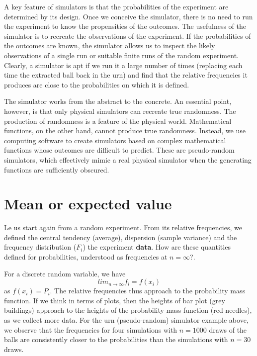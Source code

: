 \documentclass[
]{book}
\begin{document}
A key feature of simulators is that the probabilities of the experiment are determined by its design. Once we conceive the simulator, there is no need to run the experiment to know the propensities of the outcomes. The usefulness of the simulator is to recreate the observations of the experiment. If the probabilities of the outcomes are known, the simulator allows us to inspect the likely observations of a single run or suitable finite runs of the random experiment. Clearly, a simulator is apt if we run it a large number of times (replacing each time the extracted ball back in the urn) and find that the relative frequencies it produces are close to the probabilities on which it is defined.

The simulator works from the abstract to the concrete. An essential point, however, is that only physical simulators can recreate true randomness. The production of randomness is a feature of the physical world. Mathematical functions, on the other hand, cannot produce true randomness. Instead, we use computing software to create simulators based on complex mathematical functions whose outcomes are difficult to predict. These are pseudo-random simulators, which effectively mimic a real physical simulator when the generating functions are sufficiently obscured.

\hypertarget{mean-or-expected-value}{%
\section{Mean or expected value}\label{mean-or-expected-value}}

Le us start again from a random experiment. From its relative frequencies, we defined the central tendency (average), dispersion (sample variance) and the frequency distribution (\(F_i\)) the experiment \textbf{data}. How are these quantities defined for probabilities, understood as frequencies at \(n=\infty\)?.

For a discrete random variable, we have
\[lim_{n\rightarrow \infty} f_i=f(x_i)\]
as \(f(x_i)=P_i\). The relative frequencies thus approach to the probability mass function. If we think in terms of plots, then the heights of bar plot (grey buildings) approach to the heights of the probability mass function (red needles), as we collect more data. For the urn (pseudo-random) simulator example above, we observe that the frequencies for four simulations with \(n=1000\) draws of the balls are consistently closer to the probabilities than the simulations with \(n=30\) draws.
\end{document}
